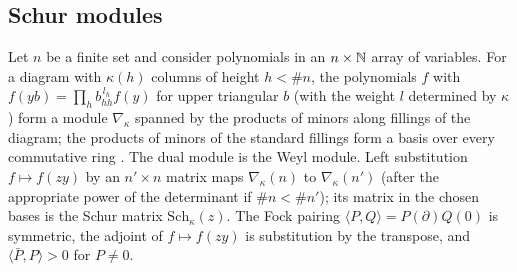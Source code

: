 \subsection{Schur modules}\label{ss:B-schur}
Let $n$ be a finite set and consider polynomials in an $n\times\mathbb{N}$ array of variables. For a diagram
with $\kappa(h)$ columns of height $h<\#n$, the polynomials $f$ with $f(yb)=\prod_hb_{hh}^{\,l_h}f(y)$ for
upper triangular $b$ (with the weight $l$ determined by $\kappa$) form a module $\nabla_\kappa$ spanned by the
products of minors along fillings of the diagram; the products of minors of the standard fillings form
a basis over every commutative ring \cite[\S8]{Fulton1997}. The dual module is the Weyl module. Left
substitution $f\mapsto f(zy)$ by an $n'\times n$ matrix maps $\nabla_\kappa(n)$ to $\nabla_\kappa(n')$
(after the appropriate power of the determinant if $\#n<\#n'$); its matrix in the chosen bases is the
Schur matrix $\mathrm{Sch}_\kappa(z)$. The Fock pairing $\langle P,Q\rangle=P(\partial)Q(0)$ is symmetric, the
adjoint of $f\mapsto f(zy)$ is substitution by the transpose, and $\langle\bar P,P\rangle>0$ for $P\ne0$.

